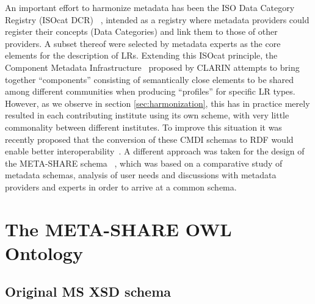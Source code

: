 \documentclass{llncs}
\begin{document}
An important effort to harmonize metadata has been the ISO Data Category Registry (ISOcat DCR) ~\cite{kemps2008isocat}, intended as a registry where metadata providers could register their concepts (Data Categories) and link them to those of other providers. A subset thereof were selected by metadata experts as the core elements for the description of LRs. Extending this ISOcat principle, the Component Metadata Infrastructure~\cite{broeder2012cmdi} proposed by CLARIN attempts to bring together ``components'' consisting of semantically close elements to be shared among different communities when producing ``profiles'' for specific LR types.
However, as  we observe in section \ref{sec:harmonization}, this has in practice
merely resulted in each contributing institute using its own scheme, with very
little commonality between different institutes. To improve this situation it
was recently proposed that the conversion of these CMDI schemas to RDF would
enable better interoperability~\cite{durco2014clarin}.
A different approach was taken for the design of the META-SHARE schema ~\cite{gavrilidou2012metashare}, which was based on a comparative study of metadata schemas, analysis of user needs and discussions with metadata providers and experts in order to arrive at a common schema.

\section{The META-SHARE OWL Ontology}
\label{sec:ontology}
\subsection{Original MS XSD schema}
\label{sec:xsd}
\end{document}
